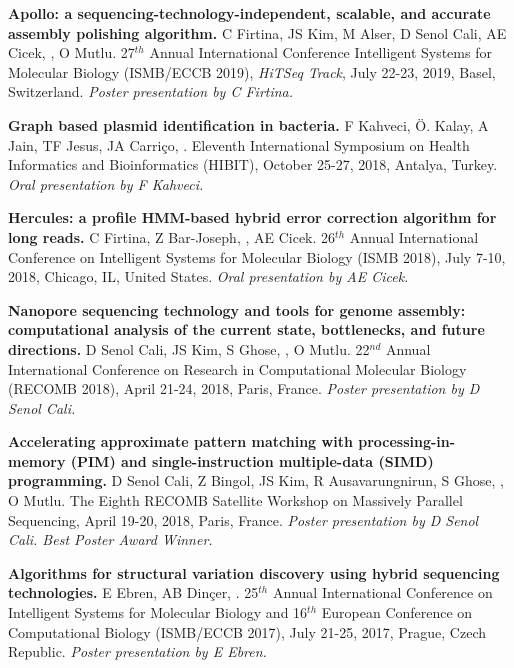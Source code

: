 \vspace{-.2cm}
   {\bf Apollo: a sequencing-technology-independent, scalable, and accurate assembly polishing algorithm.}
  C Firtina, JS Kim, M Alser, D Senol Cali, AE Cicek, \calkan{}, O Mutlu.
27$^{th}$ Annual
International Conference Intelligent Systems for Molecular Biology (ISMB/ECCB 2019), {\em HiTSeq Track},
 July 22-23, 2019, Basel, Switzerland. {\it Poster presentation by C Firtina.}


\vspace{-.2cm}
       {\bf Graph based plasmid identification in bacteria.}
       F Kahveci, Ö. Kalay, A Jain, TF Jesus, JA Carriço, \calkan{}.
       Eleventh International Symposium on Health Informatics and Bioinformatics (HIBIT), October 25-27, 2018, Antalya, Turkey.
       {\it Oral presentation by F Kahveci.}
       
\vspace{-.2cm}
        {\bf Hercules: a profile HMM-based hybrid error correction algorithm for long reads.} C Firtina, Z Bar-Joseph, \calkan{}, AE Cicek. 26$^{th}$ Annual International Conference on Intelligent Systems for Molecular Biology (ISMB 2018), July 7-10, 2018, Chicago, IL, United States.
       {\it Oral presentation by AE Cicek.}

\vspace{-.2cm}
       {\bf Nanopore sequencing technology and tools for genome assembly: computational analysis of the current state, bottlenecks, and future directions.}
       D Senol Cali, JS Kim, S Ghose, \calkan{}, O Mutlu.
       22$^{nd}$ Annual International Conference on Research in Computational Molecular Biology (RECOMB 2018), April 21-24, 2018, Paris, France.
       {\it Poster presentation by D Senol Cali.}

\vspace{-.2cm}
       {\bf Accelerating approximate pattern matching with processing-in-memory (PIM) and single-instruction multiple-data (SIMD) programming.}
       D Senol Cali, Z Bingol, JS Kim, R Ausavarungnirun, S Ghose, \calkan{},
       O Mutlu.
       The Eighth RECOMB Satellite Workshop on Massively Parallel Sequencing, April 19-20, 2018,
       Paris, France.
       {\it Poster presentation by D Senol Cali. Best Poster Award Winner.}

\vspace{-.2cm}
       {\bf Algorithms for structural variation discovery using hybrid sequencing technologies.}
       E Ebren, AB Dinçer, \calkan{}.
       25$^{th}$ Annual International Conference on Intelligent Systems for Molecular Biology and 16$^{th}$ European Conference on 
       Computational Biology  (ISMB/ECCB 2017), 
       July 21-25, 2017, Prague, Czech Republic.
       {\it Poster presentation by E Ebren.}

